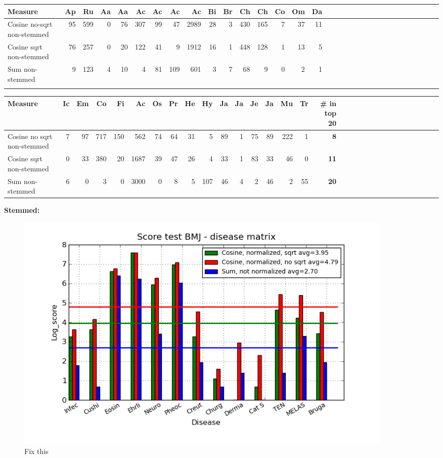 \begin{table}[H]
\begin{tiny}
  \begin{tabular}{|l|r|r|r|r|r|r|r|r|r|r|r|r|r|r|r|r|r|r|r|r|r|r|r|r|r|r|r|r|r|r|r|}
    \hline
    Measure &Ap&Ru&Aa&Aa&Ac&Ac&Ac&Ac&Bi&Br&Ch&Ch&Co&Om&Da\\
    \hline
    Cosine no-sqrt non-stemmed &95&599&0&76&307&99&47&2989&28&3&430&165&7&37&11 \\
    \hline
    Cosine sqrt non-stemmed &76&257&0&20&122&41&9&1912&16&1&448&128&1&13&5 \\
    \hline
    Sum non-stemmed &9&123&4&10&4&81&109&601&3&7&68&9&0&2&1\\
    \hline
    \multicolumn{16}{c}{} \\
    \end{tabular}
    \begin{tabular}{|l|r|r|r|r|r|r|r|r|r|r|r|r|r|r|r|r|r|r|r|r|r|r|r|r|r|r|r|r|r|r|}
    \hline
     Measure &Ic&Em&Co&Fi&Ac&Os&Pr&He&Hy&Ja&Ja&Je&Ja&Mu&Tr &  \scriptsize{\textbf{\# in top 20}} \\
    \hline
     Cosine no sqrt non-stemmed &7&97&717&150&562&74&64&31&5&89&1&75&89&222&1 & \scriptsize{\textbf{8}} \\
    \hline
     Cosine sqrt non-stemmed &0&33&380&20&1687&39&47&26&4&33&1&83&33&46&0 &\scriptsize{\textbf{11}} \\
    \hline
     Sum non-stemmed &6&0&3&0&3000&0&8&5&107&46&4&2&46&2&55 & \scriptsize{\textbf{20}} \\
     \hline
  \end{tabular}
\end{tiny}
\end{table}

\textbf{Stemmed:}

\begin{figure}[H]
        \begin{center}
          \includegraphics[width=0.9\textwidth]{barcharts/diseaseMatrix_bmj_hist_norm_3000_s_cos_sqrt_cos_sum_nn.png}
        \end{center}
        \caption{Fix this}
        \label{diseaseMatrix_bmj_hist_norm_3000_s_cos_sqrt_cos_sum_nn}
\end{figure}


